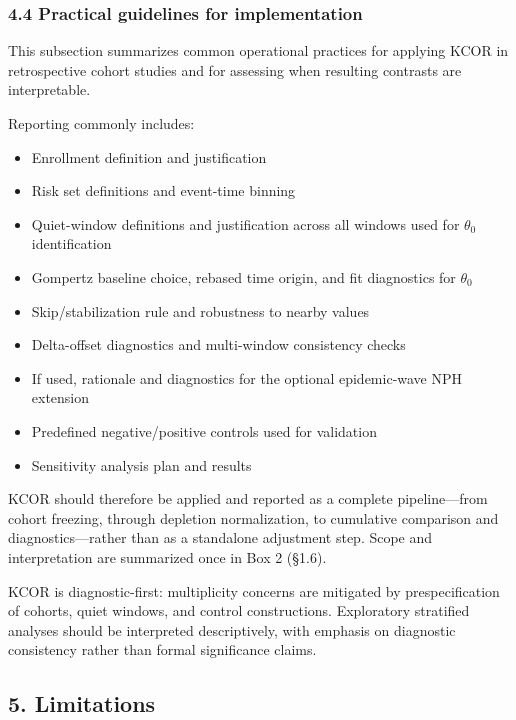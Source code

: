 \documentclass[
]{article}
\providecommand{\tightlist}{%
  \setlength{\itemsep}{0pt}\setlength{\parskip}{0pt}}
\begin{document}
\subsubsection{4.4 Practical guidelines for
implementation}\label{practical-guidelines-for-implementation}

This subsection summarizes common operational practices for applying
KCOR in retrospective cohort studies and for assessing when resulting
contrasts are interpretable.

Reporting commonly includes:

\begin{itemize}
\tightlist
\item
  Enrollment definition and justification
\item
  Risk set definitions and event-time binning
\item
  Quiet-window definitions and justification across all windows used for
  \(\theta_0\) identification
\item
  Gompertz baseline choice, rebased time origin, and fit diagnostics for
  \(\theta_0\)
\item
  Skip/stabilization rule and robustness to nearby values
\item
  Delta-offset diagnostics and multi-window consistency checks
\item
  If used, rationale and diagnostics for the optional epidemic-wave NPH
  extension
\item
  Predefined negative/positive controls used for validation
\item
  Sensitivity analysis plan and results
\end{itemize}

KCOR should therefore be applied and reported as a complete
pipeline---from cohort freezing, through depletion normalization, to
cumulative comparison and diagnostics---rather than as a standalone
adjustment step. Scope and interpretation are summarized once in Box 2
(§1.6).

KCOR is diagnostic-first: multiplicity concerns are mitigated by
prespecification of cohorts, quiet windows, and control constructions.
Exploratory stratified analyses should be interpreted descriptively,
with emphasis on diagnostic consistency rather than formal significance
claims.

\subsection{5. Limitations}\label{limitations}
\end{document}
